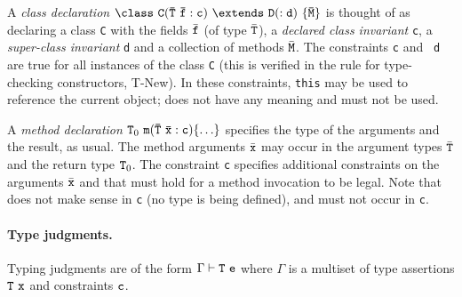 A {\em class declaration} $\tt\class \ C(\bar{T}\ \bar{f}:c)\ \extends\ D(:d)\
\{\bar{M}\}$ is thought of as declaring a class {\tt C} with the
fields $\bar{\tt f}$ (of type $\bar{\tt T}$), a {\em declared class
invariant} {\tt c}, a {\em super-class invariant} {\tt d} and a
collection of methods $\bar{\tt M}$. The constraints {\tt c} and {\tt
d} are true for all instances of the class {\tt C} (this is verified
in the rule for type-checking constructors, T-New).  In these
constraints, {\tt this} may be used to reference the current object;
\self{} does not have any meaning and must not be used.

A {\em method declaration} ${\tt T}_0\ {\tt m(\bar{\tt T}\ \bar{\tt x} :
c)\{\ldots\}}$ specifies the type of the arguments and the result, as
usual.  The method arguments $\bar{\tt x}$ may occur in the argument
types $\bar{\tt T}$ and the return type ${\tt T}_0$.  The constraint
{\tt c} specifies additional constraints on the arguments $\bar{\tt
x}$ and
\this{} that must hold for a method invocation to be legal. Note that
\self{} does not make sense in {\tt c} (no type is being defined), and must not occur in {\tt c}.

\paragraph{Type judgments.}
Typing judgments are of the form $\Gamma \vdash {\tt T}\ {\tt e}$
where $\Gamma$ is a multiset of type assertions ${\tt T}\ {\tt x}$ and
constraints ${\tt c}$. 

\def\TConstr{\mbox{\sc T-Constr}}
\def\TInv{\mbox{\sc T-Inv}}
\def\TVar{\mbox{\sc T-Var}}
\def\TField{\mbox{\sc T-Field}}
\def\TInvk{\mbox{\sc T-Invk}}
\def\TNew{\mbox{\sc T-New}}
\def\TCast{\mbox{\sc T-Cast}}
\def\TUCast{\mbox{\sc T-UCast}}
\def\TDCast{\mbox{\sc T-DCast}}
\def\TSCast{\mbox{\sc T-SCast}}

